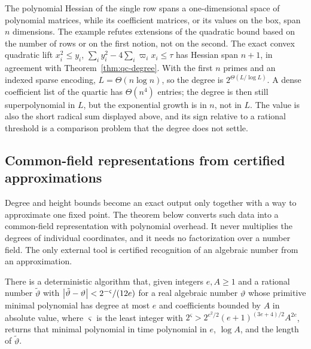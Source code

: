 The polynomial Hessian of the single row spans a one-dimensional space of
polynomial matrices, while its coefficient matrices, or its values on the
box, span $n$ dimensions. The example refutes extensions of the quadratic
bound based on the number of rows or on the first notion, not on the second.
The exact convex quadratic lift $x_i^2\le y_i$,
$\sum_iy_i^2-4\sum_i\varpi_ix_i\le\tau$ has Hessian span $n+1$, in agreement
with Theorem~\ref{thm:qc-degree}. With the first $n$ primes and an indexed
sparse encoding, $L=\Theta(n\log n)$, so the degree is
$2^{\Theta(L/\log L)}$. A dense coefficient list of the quartic has
$\Theta(n^4)$ entries; the degree is then still superpolynomial in $L$, but
the exponential growth is in $n$, not in $L$. The value is also the short
radical sum displayed above,
and its sign relative to a rational threshold is a comparison problem that
the degree does not settle.

\subsection{Common-field representations from certified approximations}
\label{app:qc-recovery}

Degree and height bounds become an exact output only together with a way to
approximate one fixed point. The theorem below converts such data into a
common-field representation with polynomial overhead. It never multiplies
the degrees of individual coordinates, and it needs no factorization over a
number field. The only external tool is certified recognition of an algebraic
number from an approximation.

\begin{theorem}
\label{thm:qc-kll}
There is a deterministic algorithm that, given integers $e,A\ge1$ and a
rational number $\tilde\vartheta$ with
$\left\lvert\tilde\vartheta-\vartheta\right\rvert<2^{-\varsigma}/(12e)$ for a real algebraic
number $\vartheta$ whose primitive minimal polynomial has degree at most $e$
and coefficients bounded by $A$ in absolute value, where $\varsigma$ is the
least integer with $2^\varsigma>2^{e^2/2}(e+1)^{(3e+4)/2}A^{2e}$, returns that
minimal polynomial in time polynomial in $e$, $\log A$, and the length of
$\tilde\vartheta$.
\end{theorem}

